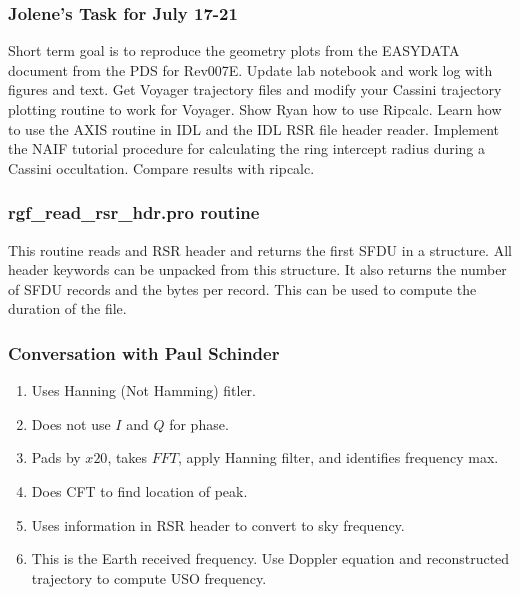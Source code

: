 \documentclass[crop=false,class=article,oneside]{standalone}
\begin{document}
        \subsubsection{Jolene's Task for July 17-21}
            Short term goal is to reproduce the geometry plots from
            the EASYDATA document from the PDS for Rev007E. Update lab
            notebook and work log with figures and text. Get Voyager
            trajectory files and modify your Cassini trajectory plotting
            routine to work for Voyager. Show Ryan how to use Ripcalc.
            Learn how to use the AXIS routine in IDL and the IDL RSR file
            header reader. Implement the NAIF tutorial procedure for
            calculating the ring intercept radius during a Cassini
            occultation. Compare results with ripcalc. 
        \subsubsection{rgf\_read\_rsr\_hdr.pro routine}
            This routine reads and RSR header and returns the first
            SFDU in a structure. All header keywords can be unpacked
            from this structure. It also returns the number of SFDU
            records and the bytes per record. This can be used to
            compute the duration of the file.
        \subsubsection{Conversation with Paul Schinder}
            \begin{enumerate}
                \item Uses Hanning (Not Hamming) fitler.
                \item Does not use $I$ and $Q$ for phase.
                \item Pads by $x20$, takes $FFT$, apply Hanning filter,
                      and identifies frequency max.
                \item Does CFT to find location of peak.
                \item Uses information in RSR header to convert
                      to sky frequency.
                \item This is the Earth received frequency.
                      Use Doppler equation and reconstructed trajectory
                      to compute USO frequency.
            \end{enumerate}
\end{document}
